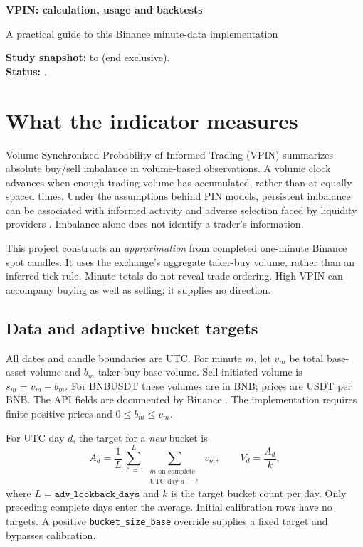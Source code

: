 \documentclass[10pt,a4paper]{article}
\begin{document}
{\LARGE\bfseries VPIN: calculation, usage and backtests\par}
{\large A practical guide to this Binance minute-data implementation\par}
\medskip
\textbf{Study snapshot:} \SnapshotStart{} to \SnapshotEnd{} (end exclusive).\\
\textbf{Status:} \RunStatus.

\section{What the indicator measures}
Volume-Synchronized Probability of Informed Trading (VPIN) summarizes absolute
buy/sell imbalance in volume-based observations. A volume clock advances when
enough trading volume has accumulated, rather than at equally spaced times.
Under the assumptions behind PIN models, persistent imbalance can be associated
with informed activity and adverse selection faced by liquidity providers
\cite{lopez,cartea}. Imbalance alone does not identify a trader's information.

This project constructs an \emph{approximation} from completed one-minute
Binance spot candles. It uses the exchange's aggregate taker-buy volume,
rather than an inferred tick rule. Minute totals do not reveal trade ordering.
High VPIN can accompany buying as well as selling; it supplies no direction.

\subsection{Data and adaptive bucket targets}
All dates and candle boundaries are UTC. For minute $m$, let $v_m$ be total
base-asset volume and $b_m$ taker-buy base volume. Sell-initiated volume is
$s_m=v_m-b_m$. For BNBUSDT these volumes are in BNB; prices are USDT per BNB.
The API fields are documented by Binance \cite{binance}. The implementation
requires finite positive prices and $0\le b_m\le v_m$.

For UTC day $d$, the target for a \emph{new} bucket is
\begin{equation}
 A_d=\frac{1}{L}\sum_{\ell=1}^{L}
       \sum_{\substack{m\text{ on complete}\\\text{UTC day }d-\ell}}v_m,
 \qquad V_d=\frac{A_d}{k},
 \label{eq:target}
\end{equation}
where $L=\texttt{adv\_lookback\_days}$ and $k$ is the target bucket count per day.
Only preceding complete days enter the average. Initial calibration rows have
no targets. A positive \texttt{bucket\_size\_base} override supplies a fixed
target and bypasses calibration.
\end{document}
